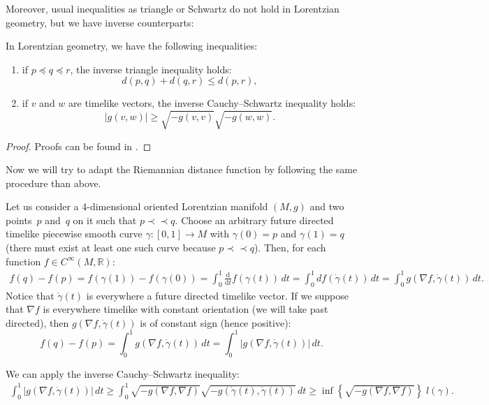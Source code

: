 \documentclass[pdftex]{sigma}
\newcommand{\abs}[1]{\left\vert {#1} \right\vert}
\newcommand{\set}[1]{\left\{ {#1} \right\}}
\newcommand{\dv}[2]{\frac{\mathrm d{#1}}{\mathrm d{#2}}}
\newcommand{\setR}{{\mathbb R}}
\newcommand{\precc}{\prec\!\!\prec}
\begin{document}
Moreover, usual inequalities as triangle or Schwartz do not hold in Lorentzian geometry, but we have inverse counterparts:

\begin{lemma}
In Lorentzian geometry, we have the following inequalities:
\begin{enumerate}\itemsep=0pt
\item if $p \preceq q \preceq r$, the inverse triangle inequality holds:
\[
d(p,q) + d(q,r) \leq d(p,r),
\]
\item if $v$ and $w$ are timelike vectors, the inverse Cauchy--Schwartz inequality holds:
\[
\abs{g(v,w)} \geq \sqrt{- g(v,v)} \sqrt{- g(w,w)}.
\]
\end{enumerate}
\end{lemma}

\begin{proof}
Proofs can be found in \cite{Beem,ONeill}.
\end{proof}

Now we will try to adapt the Riemannian distance function by following the same procedure than above.

Let us consider a 4-dimensional oriented Lorentzian manifold $(M,g)$ and two points~$p$ and~$q$ on it such that $p \precc q$. Choose an arbitrary future directed timelike piecewise smooth curve $\gamma : [0,1] \rightarrow M$ with $\gamma(0) = p$ and $\gamma(1) = q$ (there must exist at least one such curve because $p \precc q$). Then, for each function $f \in C^\infty(M,\setR)$:
\begin{gather*}
f(q) - f(p) = f(\gamma(1)) - f(\gamma(0)) = \int_0^1 \dv{}{t} f(\gamma(t)) \, dt = \int_0^1 df(\dot\gamma(t)) \, dt = \int_0^1  g( \nabla f,\dot\gamma(t)) \, dt.
\end{gather*}
Notice that $\dot\gamma(t)$ is everywhere a future directed timelike vector. If we suppose that $\nabla f$ is everywhere timelike with constant orientation (we will take past directed), then $g( \nabla f,\dot\gamma(t))$ is of constant sign (hence positive):
\[
f(q) - f(p) = \int_0^1  g( \nabla f,\dot\gamma(t)) \, dt = \int_0^1 \abs{ g( \nabla f,\dot\gamma(t)) }\, dt.
\]


We can apply the inverse Cauchy--Schwartz inequality:
\begin{gather*}
\int_0^1  \abs{g( \nabla f,\dot\gamma(t))} \, dt  \geq \int_0^1  \sqrt{-g(\nabla f,\nabla f)} \sqrt{-g(\dot\gamma(t),\dot\gamma(t))} \, dt  \geq  \inf\set{{\sqrt{-g(\nabla f,\nabla f)}}}\; l(\gamma).
\end{gather*}
\end{document}
